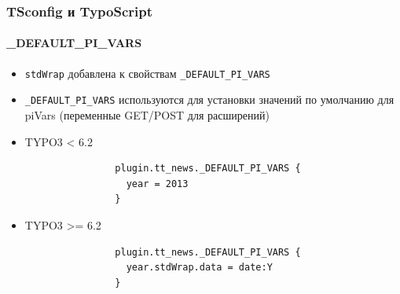 
\begin{frame}[fragile]
	\frametitle{TSconfig и TypoScript}
	\framesubtitle{\_DEFAULT\_PI\_VARS}

	\begin{itemize}
		\item \texttt{stdWrap} добавлена к свойствам \texttt{\_DEFAULT\_PI\_VARS}
		\item \texttt{\_DEFAULT\_PI\_VARS} используются для установки значений по умолчанию для piVars (переменные GET/POST 
		для расширений)

		\item TYPO3 < 6.2
			\begin{lstlisting}
				plugin.tt_news._DEFAULT_PI_VARS {
				  year = 2013
				}
			\end{lstlisting}

		\item TYPO3 >= 6.2
			\begin{lstlisting}
				plugin.tt_news._DEFAULT_PI_VARS {
				  year.stdWrap.data = date:Y
				}
			\end{lstlisting}

	\end{itemize}

\end{frame}


